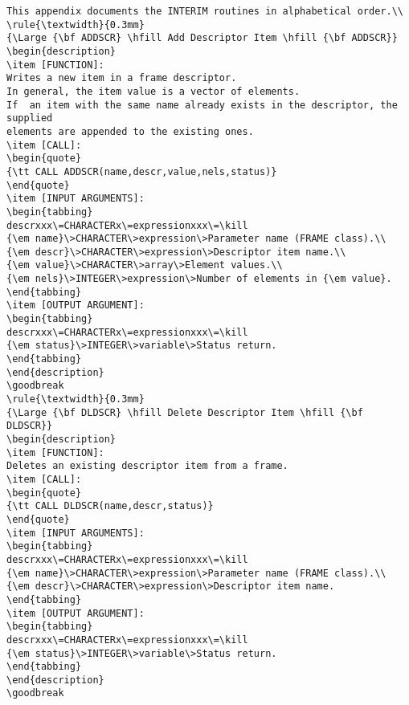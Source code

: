 \begin{verbatim}
This appendix documents the INTERIM routines in alphabetical order.\\
\rule{\textwidth}{0.3mm}
{\Large {\bf ADDSCR} \hfill Add Descriptor Item \hfill {\bf ADDSCR}}
\begin{description}
\item [FUNCTION]:
Writes a new item in a frame descriptor.
In general, the item value is a vector of elements.
If  an item with the same name already exists in the descriptor, the supplied
elements are appended to the existing ones.
\item [CALL]:
\begin{quote}
{\tt CALL ADDSCR(name,descr,value,nels,status)}
\end{quote}
\item [INPUT ARGUMENTS]:
\begin{tabbing}
descrxxx\=CHARACTERx\=expressionxxx\=\kill
{\em name}\>CHARACTER\>expression\>Parameter name (FRAME class).\\
{\em descr}\>CHARACTER\>expression\>Descriptor item name.\\
{\em value}\>CHARACTER\>array\>Element values.\\
{\em nels}\>INTEGER\>expression\>Number of elements in {\em value}.
\end{tabbing}
\item [OUTPUT ARGUMENT]:
\begin{tabbing}
descrxxx\=CHARACTERx\=expressionxxx\=\kill
{\em status}\>INTEGER\>variable\>Status return.
\end{tabbing}
\end{description}
\goodbreak
\rule{\textwidth}{0.3mm}
{\Large {\bf DLDSCR} \hfill Delete Descriptor Item \hfill {\bf DLDSCR}}
\begin{description}
\item [FUNCTION]:
Deletes an existing descriptor item from a frame.
\item [CALL]:
\begin{quote}
{\tt CALL DLDSCR(name,descr,status)}
\end{quote}
\item [INPUT ARGUMENTS]:
\begin{tabbing}
descrxxx\=CHARACTERx\=expressionxxx\=\kill
{\em name}\>CHARACTER\>expression\>Parameter name (FRAME class).\\
{\em descr}\>CHARACTER\>expression\>Descriptor item name.
\end{tabbing}
\item [OUTPUT ARGUMENT]:
\begin{tabbing}
descrxxx\=CHARACTERx\=expressionxxx\=\kill
{\em status}\>INTEGER\>variable\>Status return.
\end{tabbing}
\end{description}
\goodbreak
\end{verbatim}

